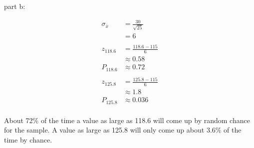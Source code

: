 \documentclass[landscape]{exam}
\begin{document}
\begin{description}
      part b:

      \begin{align*}
        \sigma_{\bar{x}} & = \frac{30}{\sqrt{25}} \\
                         & = 6 \\
        \\
        z_{118.6}        & = \frac{118.6 - 115}{6} \\
                         & \approx 0.58 \\
        P_{118.6}        & \approx 0.72 \\
        \\
        z_{125.8}        & = \frac{125.8 - 115}{6} \\
                         & \approx 1.8 \\
        P_{125.8}        & \approx 0.036 \\
      \end{align*}

      About 72\% of the time a value as large as 118.6 will come up by random
      chance for the sample. A value as large as 125.8 will only come up about
      3.6\% of the time by chance.
  \end{description}
\end{document}
